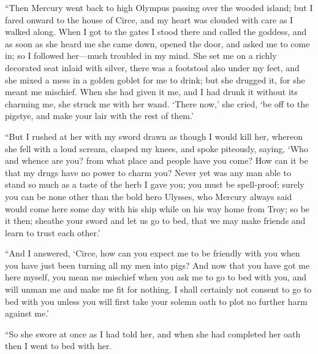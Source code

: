 “Then Mercury went back to high Olympus passing over the wooded island; but I
fared onward to the house of Circe, and my heart was clouded with care as I
walked along. When I got to the gates I stood there and called the goddess, and
as soon as she heard me she came down, opened the door, and asked me to come
in; so I followed her—much troubled in my mind. She set me on a richly
decorated seat inlaid with silver, there was a footstool also under my feet,
and she mixed a mess in a golden goblet for me to drink; but she drugged it,
for she meant me mischief. When she had given it me, and I had drunk it without
its charming me, she struck me with her wand. ‘There now,’ she cried, ‘be off
to the pigstye, and make your lair with the rest of them.’

“But I rushed at her with my sword drawn as though I would kill her, whereon
she fell with a loud scream, clasped my knees, and spoke piteously, saying,
‘Who and whence are you? from what place and people have you come? How can it
be that my drugs have no power to charm you? Never yet was any man able to
stand so much as a taste of the herb I gave you; you must be spell-proof;
surely you can be none other than the bold hero Ulysses, who Mercury always
said would come here some day with his ship while on his way home from Troy; so
be it then; sheathe your sword and let us go to bed, that we may make friends
and learn to trust each other.’

“And I answered, ‘Circe, how can you expect me to be friendly with you when you
have just been turning all my men into pigs? And now that you have got me here
myself, you mean me mischief when you ask me to go to bed with you, and will
unman me and make me fit for nothing. I shall certainly not consent to go to
bed with you unless you will first take your solemn oath to plot no further
harm against me.’

“So she swore at once as I had told her, and when she had completed her oath
then I went to bed with her.

